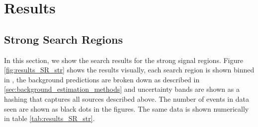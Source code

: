 \section{Results} \label{sec:results}
  \subsection{Strong Search Regions} \label{sec:strong_search_regions}
    In this section, we show the search results for the strong signal regions. Figure \ref{fig:results_SR_str} shows the results visually, each search region is shown binned in \MET, the background predictions are broken down as described in \ref{sec:background_estimation_methods} and uncertainty bands are shown as a hashing that captures all sources described above. The number of events in data seen are shown as black dots in the figures. The same data is shown numerically in table \ref{tab:results_SR_str}.

